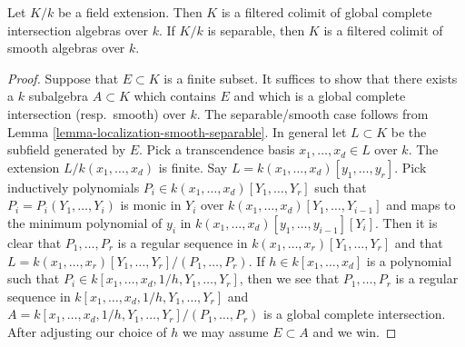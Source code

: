 \begin{lemma}
\label{lemma-colimit-syntomic}
Let $K/k$ be a field extension.
Then $K$ is a filtered colimit of global complete intersection
algebras over $k$. If $K/k$ is separable, then $K$ is a filtered
colimit of smooth algebras over $k$.
\end{lemma}

\begin{proof}
Suppose that $E \subset K$ is a finite subset. It suffices to show that
there exists a $k$ subalgebra $A \subset K$ which contains $E$
and which is a global complete intersection (resp.\ smooth) over $k$.
The separable/smooth case follows from
Lemma \ref{lemma-localization-smooth-separable}.
In general let $L \subset K$ be the subfield generated by $E$.
Pick a transcendence basis $x_1, \ldots, x_d \in L$ over $k$.
The extension $L/k(x_1, \ldots, x_d)$ is finite.
Say $L = k(x_1, \ldots, x_d)[y_1, \ldots, y_r]$.
Pick inductively polynomials $P_i \in k(x_1, \ldots, x_d)[Y_1, \ldots, Y_r]$
such that $P_i = P_i(Y_1, \ldots, Y_i)$ is monic in $Y_i$ over
$k(x_1, \ldots, x_d)[Y_1, \ldots, Y_{i - 1}]$ and maps to the
minimum polynomial of $y_i$ in
$k(x_1, \ldots, x_d)[y_1, \ldots, y_{i - 1}][Y_i]$.
Then it is clear that $P_1, \ldots, P_r$ is a regular sequence
in $k(x_1, \ldots, x_r)[Y_1, \ldots, Y_r]$ and that
$L = k(x_1, \ldots, x_r)[Y_1, \ldots, Y_r]/(P_1, \ldots, P_r)$.
If $h \in k[x_1, \ldots, x_d]$ is a polynomial such that
$P_i \in k[x_1, \ldots, x_d, 1/h, Y_1, \ldots, Y_r]$, then
we see that $P_1, \ldots, P_r$ is a regular sequence in
$k[x_1, \ldots, x_d, 1/h, Y_1, \ldots, Y_r]$ and
$A = k[x_1, \ldots, x_d, 1/h, Y_1, \ldots, Y_r]/(P_1, \ldots, P_r)$
is a global complete intersection. After adjusting our choice of $h$
we may assume $E \subset A$ and we win.
\end{proof}
